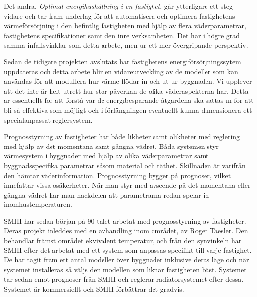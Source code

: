 Det andra, \textit{Optimal energihushållning i en fastighet}\cite{kandidatarbete2010}, går ytterligare ett steg vidare och tar fram underlag för att automatisera och optimera fastighetens värmeförsörjning i den befintlig fastigheten med hjälp av flera väderparametrar, fastighetens specifikationer samt den inre verksamheten. Det har i högre grad samma infallsvinklar som detta arbete, men ur ett mer övergripande perspektiv.

Sedan de tidigare projekten avslutats har fastighetens energiförsörjningssytem uppdateras och detta arbete blir en vidareutveckling av de modeller som kan användas för att modullera hur värme flödar in och ut ur byggnaden. Vi upplever att det inte är helt utrett hur stor påverkan de olika väderaspekterna har. Detta är essentiellt för att förstå var de energibesparande åtgärdena ska sättas in för att bli så effektiva som möjligt och i förlängningen eventuellt kunna dimensionera ett specialanpassat reglersystem.

Prognosstyrning av fastigheter har både likheter samt olikheter med reglering med hjälp av det momentana samt gångna vädret. Båda systemen styr värmesystem i byggnader med hjälp av olika väderparametrar samt byggnadsspecifika parametrar såsom material och täthet. Skillnaden är varifrån den hämtar väderinformation. Prognosstyrning bygger på prognoser, vilket innefattar vissa osäkerheter. När man styr med avseende på det momentana eller gångna vädret har man nackdelen att parametrarna redan spelar in inomhustemperaturen.

SMHI har sedan början på 90-talet arbetat med prognosstyrning av fastigheter. Deras projekt inleddes med en avhandling inom området, av Roger Taesler. Den behandlar främst området ekvivalent temperatur, och från den synvinkeln har SMHI efter det arbetat med ett system som anpassas specifikt till varje fastighet. De har tagit fram ett antal modeller över byggnader inklusive deras läge och när systemet installeras så väljs den modellen som liknar fastigheten bäst. Systemet tar sedan emot prognoser från SMHI och reglerar radiatorsystemet efter dessa. Systemet är kommersiellt och SMHI förbättrar det gradvis.





